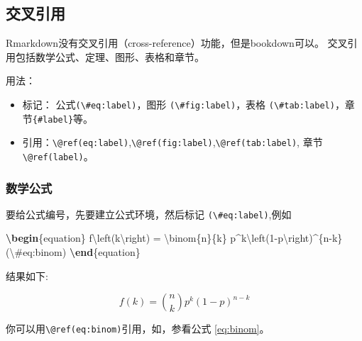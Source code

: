 \documentclass[]{article}
\newenvironment{Shaded}{\begin{snugshade}}{\end{snugshade}}
\newcommand{\ExtensionTok}[1]{#1}
\newcommand{\KeywordTok}[1]{\textcolor[rgb]{0.13,0.29,0.53}{\textbf{#1}}}
\newcommand{\NormalTok}[1]{#1}
\newcommand{\SpecialCharTok}[1]{\textcolor[rgb]{0.00,0.00,0.00}{#1}}
\newcommand{\SpecialStringTok}[1]{\textcolor[rgb]{0.31,0.60,0.02}{#1}}
\begin{document}
\subsection{交叉引用}

Rmarkdown没有交叉引用（cross-reference）功能，但是bookdown可以。
交叉引用包括数学公式、定理、图形、表格和章节。

用法：

\begin{itemize}
\item
  标记： 公式\texttt{(\textbackslash{}\#eq:label)}，图形
  \texttt{(\textbackslash{}\#fig:label)}，表格
  \texttt{(\textbackslash{}\#tab:label)}，章节\texttt{\{\#label\}}等。
\item
  引用：\texttt{\textbackslash{}@ref(eq:label)},\texttt{\textbackslash{}@ref(fig:label)},\texttt{\textbackslash{}@ref(tab:label)},
  章节 \texttt{\textbackslash{}@ref(label)}。
\end{itemize}

\hypertarget{equations}{%
\subsubsection{数学公式}\label{equations}}

要给公式编号，先要建立公式环境，然后标记
\texttt{(\textbackslash{}\#eq:label)},例如

\begin{Shaded}
\begin{Highlighting}[]
\KeywordTok{\textbackslash{}begin}\NormalTok{\{}\ExtensionTok{equation}\NormalTok{\}}\SpecialStringTok{ }
\SpecialStringTok{  f}\SpecialCharTok{\textbackslash{}left}\SpecialStringTok{(k}\SpecialCharTok{\textbackslash{}right}\SpecialStringTok{) = }\SpecialCharTok{\textbackslash{}binom}\SpecialStringTok{\{n\}\{k\} p^k}\SpecialCharTok{\textbackslash{}left}\SpecialStringTok{(1-p}\SpecialCharTok{\textbackslash{}right}\SpecialStringTok{)^\{n-k\}}
\SpecialStringTok{  (}\SpecialCharTok{\textbackslash{}#}\SpecialStringTok{eq:binom)}
\KeywordTok{\textbackslash{}end}\NormalTok{\{}\ExtensionTok{equation}\NormalTok{\} }
\end{Highlighting}
\end{Shaded}

结果如下:

\begin{equation}
f\left(k\right)=\binom{n}{k}p^k\left(1-p\right)^{n-k} \label{eq:binom}
\end{equation}

你可以用\texttt{\textbackslash{}@ref(eq:binom)}引用，如，参看公式
\eqref{eq:binom}。
\end{document}
